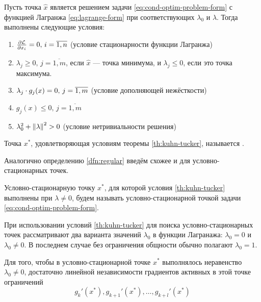 \begin{thm}
  \label{th:kuhn-tucker}
  Пусть точка $\hat{x}$ является решением задачи
  \eqref{eq:cond-optim-problem-form} с функцией Лагранжа
  \eqref{eq:lagrange-form} при соответствующих $\lambda_0$ и
  $\lambda$. Тогда выполнены следующие условия:
  \begin{enumerate}
    \renewcommand{\labelenumi}{\emph{\asbuk{enumi})}}
  \item $\frac{\partial{\mathcal{L}}}{\partial{x_i}}=0,\, i=\overline{1,n}$ (условие
    стационарности функции Лагранжа)
  \item $\lambda_j \geq 0,\, j=\overline{1,m}$, если $\hat{x}$ — точка
    минимума, и $\lambda_j \leq 0$, если это точка максимума.
  \item $\lambda_j \cdot g_j(x) = 0,\, j=\overline{1,m}$ (условие
    дополняющей нежёсткости)
  \item $g_j(x) \leq 0,\, j=\overline{1,m}$
  \item $\lambda_0^2 + \left \lVert{\lambda}\right \rVert^2 > 0$ (условие нетривиальности решения)
  \end{enumerate}
\end{thm}

\begin{dfn}
  Точка $x^*$, удовлетворяющая условиям теоремы \ref{th:kuhn-tucker},
  называется .
\end{dfn}

Аналогично определению \ref{dfn:regular} введём схожее и для
условно-стационарных точек.
\begin{dfn}
  Условно-стационарную точку $x^*$, для которой условия
  \ref{th:kuhn-tucker} выполнены при $\lambda ≠ 0$, будем называть
   условно-стационарной точкой задачи
  \eqref{eq:cond-optim-problem-form}.
\end{dfn}

При использовании условий \ref{th:kuhn-tucker} для поиска
условно-стационарных точек рассматривают два варианта значений
$\lambda_0$ в функции Лагранажа: $\lambda_0=0$ и $\lambda_0 \neq 0$. В
последнем случае без ограничения общности обычно полагают $\lambda_0 =
1$.

\begin{thm}
  Для того, чтобы в условно-стационарной точке $x^*$ выполнялось
  неравенство $\lambda_0 \neq 0$, достаточно линейной независимости
  градиентов активных в этой точке ограничений
  \begin{equation*}
    g_k'(x^*), g_{k+1}'(x^*), \dotsc, g_{k+l}'(x^*)
  \end{equation*}
\end{thm}


